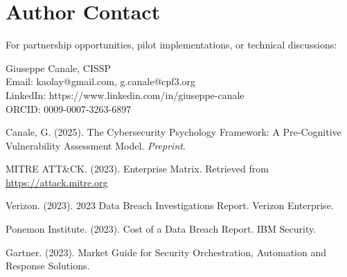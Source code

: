 \documentclass[11pt,a4paper]{article}
\begin{document}
\section*{Author Contact}

For partnership opportunities, pilot implementations, or technical discussions:

Giuseppe Canale, CISSP\\
Email: kaolay@gmail.com, g.canale@cpf3.org\\
LinkedIn: https://www.linkedin.com/in/giuseppe-canale\\
ORCID: 0009-0007-3263-6897

\begin{thebibliography}{99}

Canale, G. (2025). The Cybersecurity Psychology Framework: A Pre-Cognitive Vulnerability Assessment Model. \textit{Preprint}.

MITRE ATT\&CK. (2023). Enterprise Matrix. Retrieved from \url{https://attack.mitre.org}

Verizon. (2023). 2023 Data Breach Investigations Report. Verizon Enterprise.

Ponemon Institute. (2023). Cost of a Data Breach Report. IBM Security.

Gartner. (2023). Market Guide for Security Orchestration, Automation and Response Solutions.

\end{thebibliography}
\end{document}
